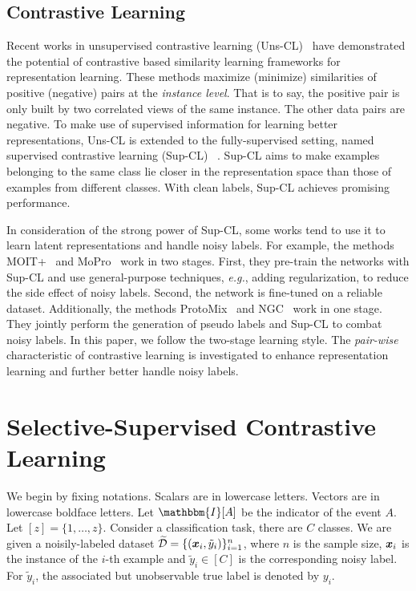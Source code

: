 \documentclass[10pt,twocolumn,letterpaper]{article}
\newcommand{\bm}[1]{\mbox{\boldmath{$#1$}}}
\begin{document}
\subsection{Contrastive Learning}
Recent works in unsupervised contrastive learning (Uns-CL)~\cite{chen2020simple,chen2020big,He0WXG20,wang2021cris} have demonstrated the potential of contrastive based similarity learning frameworks for representation learning. These methods maximize (minimize) similarities of positive (negative) pairs at the \textit{instance level}. That is to say, the positive pair is only built by two correlated views of the same instance. The other data pairs are negative. To make use of supervised information for learning better representations, Uns-CL is extended to the fully-supervised setting, named supervised contrastive learning (Sup-CL) ~\cite{Khosla2020}. Sup-CL aims to make examples belonging to the same class lie closer in the representation space than those of examples from different classes. With clean labels, Sup-CL achieves promising performance. 

In consideration of the strong power of Sup-CL, some works tend to use it to learn latent representations and handle noisy labels. For example, the methods MOIT+~\cite{Ortego2021} and MoPro~\cite{Li2021ICLR} work in two stages. First, they pre-train the networks with Sup-CL and use general-purpose techniques, \textit{e.g.}, adding regularization, to reduce the side effect of noisy labels. Second, the network is fine-tuned on a reliable dataset. Additionally, the methods ProtoMix~\cite{li2020learning} and NGC~\cite{Zhi2021ICCV} work in one stage. They jointly perform the generation of pseudo labels and Sup-CL to combat noisy labels. In this paper, we follow the two-stage learning style. The \textit{pair-wise} characteristic of contrastive learning is investigated to enhance representation learning and further better handle noisy labels. 
\vspace{-3pt}
\section{Selective-Supervised Contrastive Learning}\label{sec:3}


We begin by fixing notations. Scalars are in lowercase letters. Vectors are in lowercase boldface letters. Let $\mathbbm{I}[A]$ be the indicator of the event $A$. Let $[z]=\{1,\ldots,z\}$. 
Consider a classification task, there are $C$ classes. We are given a noisily-labeled dataset $\widetilde{\mathcal{D}}= \{ (\bm{x}_i,\tilde{y}_i )\}_{i=1}^n$, where $n$ is the sample size, $\bm{x}_i$ is the instance of the $i$-th example and $\tilde{y}_i \in [C]$ is the corresponding noisy label. For $\tilde{y}_i$, the associated but unobservable true label is denoted by $y_i$. 
\end{document}
